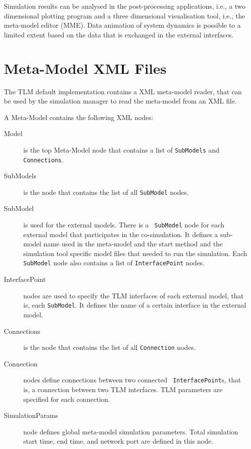 Simulation results can be analysed in the post-processing
applications, i.e., a two dimensional plotting program and a three
dimensional visualisation tool, i.e., the meta-model editor
(MME). Data animation of system dynamics is possible to a limited
extent based on the data that is exchanged in the external interfaces.

\section{Meta-Model XML Files}
\label{meta}
The TLM default implementation contains a XML meta-model reader, that
can be used by the simulation manager to read the meta-model from an
XML file.

A Meta-Model contains the following XML nodes:
\begin{description}
\item[Model] is the top Meta-Model node that contains a list of {\tt SubModels} and {\tt Connections}.
\item[SubModels] is the node that contains the list of all {\tt SubModel} nodes.
\item[SubModel] is used for the external models. There is a {\tt
  SubModel} node for each external model that participates in the
  co-simulation. It defines a sub-model name used in the meta-model
  and the start method and the simulation tool specific model files
  that needed to run the simulation. Each {\tt SubModel} node also
  contains a list of {\tt InterfacePoint} nodes.
\item[InterfacePoint] nodes are used to specify the TLM interfaces of
  each external model, that is, each {\tt SubModel}. It defines the
  name of a certain interface in the external model.
\item[Connections] is the node that contains the list of all {\tt Connection} nodes.
\item[Connection] nodes define connections between two connected {\tt
  InterfacePoint}s, that is, a connection between two TLM
  interfaces. TLM parameters are specified for each connection.
\item[SimulationParams] node defines global meta-model simulation
  parameters. Total simulation start time, end time, and network port
  are defined in this node.
\end{description}



